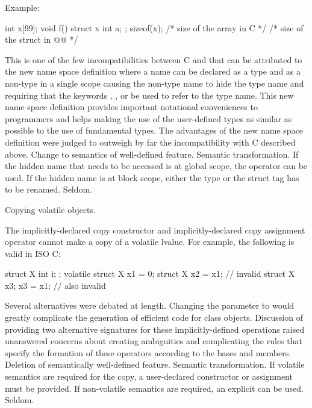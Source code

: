 Example:
\begin{codeblock}
int x[99];
void f() {
  struct x { int a; };
  sizeof(x);  /* size of the array in C */
  /* size of the struct in @\textit{\textrm{\Cpp{}}}@ */
}
\end{codeblock}
\rationale
This is one of the few incompatibilities between C and \Cpp{} that
can be attributed to the new \Cpp{} name space definition where a
name can be declared as a type and as a non-type in a single scope
causing the non-type name to hide the type name and requiring that
the keywords , ,  or  be used to refer to the type name.
This new name space definition provides important notational
conveniences to \Cpp{} programmers and helps making the use of the
user-defined types as similar as possible to the use of fundamental
types.
The advantages of the new name space definition were judged to
outweigh by far the incompatibility with C described above.
\effect
Change to semantics of well-defined feature.
\difficulty
Semantic transformation.
If the hidden name that needs to be accessed is at global scope,
the \tcode{::} \Cpp{} operator can be used.
If the hidden name is at block scope, either the type or the struct
tag has to be renamed.
\howwide
Seldom.

\change
Copying volatile objects.

The implicitly-declared copy constructor and
implicitly-declared copy assignment operator
cannot make a copy of a volatile lvalue.
For example, the following is valid in ISO C:
\begin{codeblock}
struct X { int i; };
volatile struct X x1 = {0};
struct X x2 = x1;               // invalid \Cpp{}
struct X x3;
x3 = x1;                        // also invalid \Cpp{}
\end{codeblock}

\rationale
Several alternatives were debated at length.
Changing the parameter to
would greatly complicate the generation of
efficient code for class objects.
Discussion of
providing two alternative signatures for these
implicitly-defined operations raised
unanswered concerns about creating
ambiguities and complicating
the rules that specify the formation of
these operators according to the bases and
members.
\effect
Deletion of semantically well-defined feature.
\difficulty
Semantic transformation.
If volatile semantics are required for the copy,
a user-declared constructor or assignment must
be provided.
If non-volatile semantics are required,
an explicit
can be used.
\howwide
Seldom.

